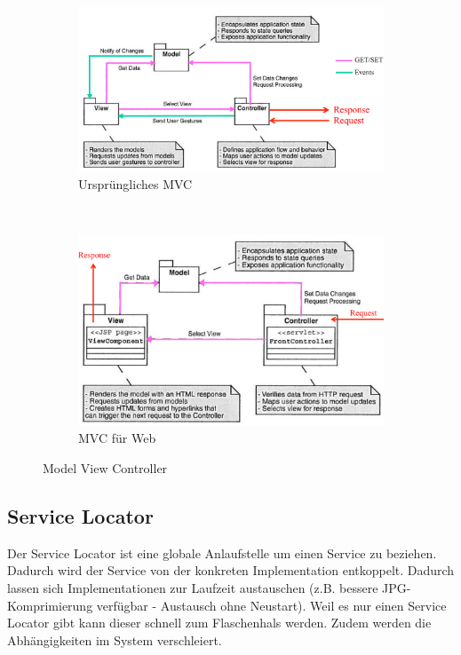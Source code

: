 \begin{figure}
	\centering
	\begin{subfigure}[b]{0.5\textwidth}
		\includegraphics[width=\textwidth]{fig/mvc1}
		\caption{Ursprüngliches MVC}
		\label{fig:mvc1}
	\end{subfigure}
	~
	\begin{subfigure}[b]{0.4\textwidth}
		\includegraphics[width=\textwidth]{fig/mvc2}
		\caption{MVC für Web}
		\label{fig:mvc2}
	\end{subfigure}
	\caption{Model View Controller}
\end{figure}

\subsection{Service Locator}

Der Service Locator ist eine globale Anlaufstelle um einen Service zu beziehen. Dadurch wird der Service von der konkreten Implementation entkoppelt. Dadurch lassen sich Implementationen zur Laufzeit austauschen (z.B. bessere JPG-Komprimierung verfügbar - Austausch ohne Neustart). Weil es nur einen Service Locator gibt kann dieser schnell zum Flaschenhals werden. Zudem werden die Abhängigkeiten im System verschleiert.

